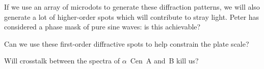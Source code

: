 \documentclass[a4paper,12pt]{article}
\begin{document}
If we use an array of microdots to generate these diffraction patterns, we will also generate a lot of higher-order spots which will contribute to stray light. Peter has considered a phase mask of pure sine waves: is this achievable?

Can we use these first-order diffractive spots to help constrain the plate scale?

Will crosstalk between the spectra of $\alpha$~Cen~A and~B kill us?
\end{document}
